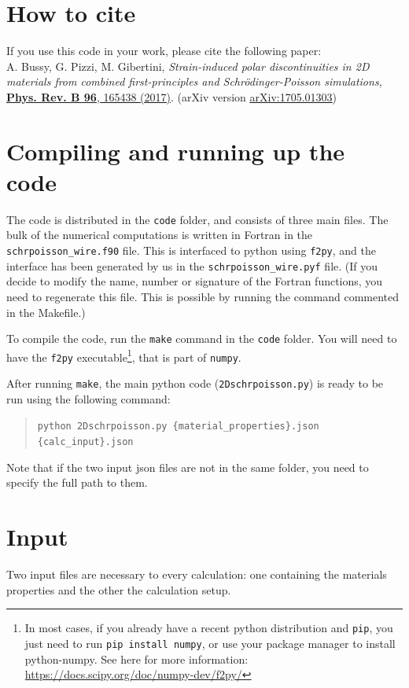 \documentclass[a4paper,12pt]{article}
\begin{document}
\section{How to cite}
If you use this code in your work, please cite the following paper: \\
A. Bussy, G. Pizzi, M. Gibertini, \emph{Strain-induced polar discontinuities in 2D materials from combined first-principles and Schr\"odinger-Poisson simulations}, \underline{\href{http://doi.org/10.1103/PhysRevB.96.165438}{\textbf{Phys. Rev. B 96}, 165438 (2017)}}. 
(arXiv version \underline{\href{http://arxiv.org/abs/1705.01303}{arXiv:1705.01303}})

\section{Compiling and running up the code}
The code is distributed in the \texttt{code} folder, and consists of three main files.
The bulk of the numerical computations is written in Fortran in the  \texttt{schrpoisson\_wire.f90} file. This is interfaced to python using \texttt{f2py}, and the interface has been generated by us in the \texttt{schrpoisson\_wire.pyf} file. (If you decide to modify the name, number or signature of the Fortran functions, you need to regenerate this file. This is possible by running the command commented in the Makefile.)

To compile the code, run the \texttt{make} command in the \texttt{code} folder.
You will need to have the \texttt{f2py} executable\footnote{In most cases, if you already have a recent python distribution and \texttt{pip}, you just need to run \texttt{pip install numpy}, or use your package manager to install python-numpy. See here for more information: \url{https://docs.scipy.org/doc/numpy-dev/f2py/}}, that is part of \texttt{numpy}. 

After running \texttt{make}, the main python code (\texttt{2Dschrpoisson.py}) is ready to be run using the following command:

\begin{quote}
\texttt{python 2Dschrpoisson.py \{material\_properties\}.json  \{calc\_input\}.json}
\end{quote}

Note that if the two input json files are not in the same folder, you need to specify the full path to them.

\section{\label{sec:input}Input}
Two input files are necessary to every calculation: one containing the materials properties and the other the calculation setup. 
\end{document}
